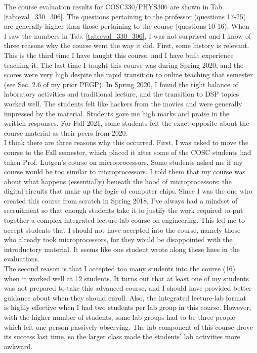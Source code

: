 \documentclass[../../main.tex]{subfiles}
\begin{document}
The course evaluation results for COSC330/PHYS306 are shown in Tab. \ref{tab:eval_330_306}.  The questions pertaining to the professor (questions 17-25) are generally higher than those pertaining to the course (questions 10-16).  When I saw the numbers in Tab. \ref{tab:eval_330_306}, I was not surprised and I know of three reasons why the course went the way it did.  First, some history is relevant.  This is the third time I have taught this course, and I have built experience teaching it.  The last time I taught this course was during Spring 2020, and the scores were very high despite the rapid transition to online teaching that semester (see Sec. 2.6 of my prior PEGP).  In Spring 2020, I found the right balance of laboratory activities and traditional lecture, and the transition to DSP topics worked well.  The students felt like hackers from the movies and were generally impressed by the material.  Students gave me high marks and praise in the written responses.  For Fall 2021, some students felt the exact opposite about the course material as their peers from 2020.
\\
\vspace{0.25cm}
I think there are three reasons why this occurred.  First, I was asked to move the course to the Fall semester, which placed it after some of the COSC students had taken Prof. Lutgen's course on microprocessors.  Some students asked me if my course would be too similar to microprocessors.  I told them that my course was about what happens (essentially) beneath the hood of microprocessors: the digital circuits that make up the logic of computer chips.  Since I was the one who created this course from scratch in Spring 2018, I've always had a mindset of recruitment so that enough students take it to justify the work required to put together a complex integrated lecture-lab course on engineering.  This led me to accept students that I should not have accepted into the course, namely those who already took microprocessors, for they would be disappointed with the introductory material.  It seems like one student wrote along these lines in the evaluations.
\\
\vspace{0.25cm}
The second reason is that I accepted too many students into the course (16) when it worked well at 12 students.  It turns out that at least one of my students was not prepared to take this advanced course, and I should have provided better guidance about when they should enroll.  Also, the integrated lecture-lab format is highly effective when I had two students per lab group in this course.  However, with the higher number of students, some lab groups had to be three people which left one person passively observing.  The lab component of this course drove its success last time, so the larger class made the students' lab activities more awkward.
\end{document}
